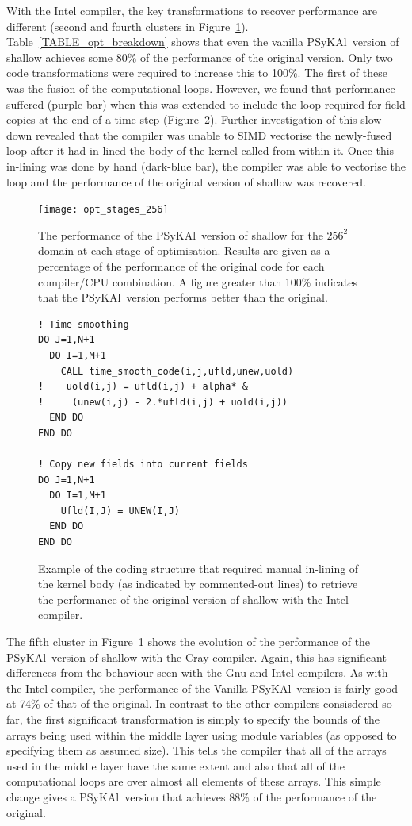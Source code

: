 \documentclass[journal]{IEEEtran}
\newcommand{\psykal}{{PS}y{KA}l\ }
\begin{document}
With the Intel compiler, the key transformations to recover
performance are different (second and fourth clusters in
Figure~\ref{FIG_opt_stages_256}).  Table~\ref{TABLE_opt_breakdown}
shows that even the vanilla \psykal version of shallow achieves some
80\% of the performance of the original version. Only two code
transformations were required to increase this to 100\%. The first of
these was the fusion of the computational loops. However, we found
that performance suffered (purple bar) when this was extended to
include the loop required for field copies at the end of a time-step
(Figure~\ref{FIG_time_smooth_code}). Further investigation of this
slow-down revealed that the compiler was unable to SIMD vectorise the
newly-fused loop after it had in-lined the body of the kernel called
from within it. Once this in-lining was done by hand (dark-blue bar),
the compiler was able to vectorise the loop and the performance of the
original version of shallow was recovered.

\begin{figure}[!t]
\centering
\texttt{[image: opt\_stages\_256]}
\caption{The performance of the \psykal version of shallow for the
  $256^{2}$ domain at each stage of optimisation. Results are given as
  a percentage of the performance of the original code for each
  compiler/CPU combination. A figure greater than 100\% indicates that
  the \psykal version performs better than the original.}
\label{FIG_opt_stages_256}
\end{figure}

\begin{figure}
\begin{verbatim}
! Time smoothing
DO J=1,N+1
  DO I=1,M+1
    CALL time_smooth_code(i,j,ufld,unew,uold)
!    uold(i,j) = ufld(i,j) + alpha* &
!     (unew(i,j) - 2.*ufld(i,j) + uold(i,j))
  END DO
END DO

! Copy new fields into current fields
DO J=1,N+1
  DO I=1,M+1
    Ufld(I,J) = UNEW(I,J)
  END DO
END DO
\end{verbatim}
\caption{Example of the coding structure that required manual
  in-lining of the kernel body (as indicated by commented-out lines)
  to retrieve the performance of the original version of shallow with
  the Intel compiler.}
\label{FIG_time_smooth_code}
\end{figure}

The fifth cluster in Figure~\ref{FIG_opt_stages_256} shows the
evolution of the performance of the \psykal version of shallow with
the Cray compiler. Again, this has significant differences from the
behaviour seen with the Gnu and Intel compilers. As with the Intel
compiler, the performance of the Vanilla \psykal version is fairly
good at 74\% of that of the original. In contrast to the other
compilers consisdered so far, the first significant transformation is
simply to specify the bounds of the arrays being used within the
middle layer using module variables (as opposed to specifying them as
assumed size). This tells the compiler that all of the arrays used in
the middle layer have the same extent and also that all of the
computational loops are over almost all elements of these arrays. This
simple change gives a \psykal version that achieves 88\% of the
performance of the original.
\end{document}
